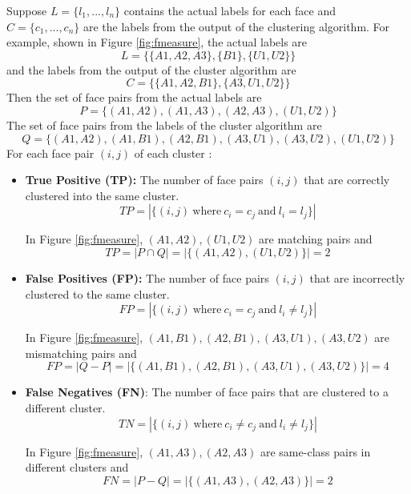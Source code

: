 \documentclass[12pt,english]{article}
\begin{document}
Suppose $L = \{l_{1},...,l_{n}\}$ contains the actual labels for each face and $C = \{c_{1},...,c_{n}\}$ are the labels from the output of the clustering algorithm. For example, shown in Figure \ref{fig:fmeasure}, the actual labels are $$L = \{\{A1, A2, A3\}, \{B1\}, \{U1, U2\}\}$$ and the labels from the output of the cluster algorithm are $$C = \{\{A1, A2, B1\}, \{A3, U1, U2 \}\}$$
Then the set of face pairs from the actual labels are $$P = \{(A1, A2), (A1, A3), (A2, A3), (U1, U2)\}$$ 
The set of face pairs from the labels of the cluster algorithm are $$Q = \{(A1, A2), (A1, B1), (A2, B1), (A3, U1), (A3, U2), (U1, U2)\}$$
For each face pair $(i, j)$ of each cluster \cite{thesis}: \\
\begin{itemize}
\item \textbf{True Positive (TP):} The number of face pairs $(i, j)$ that are correctly clustered into the same cluster.
$$TP = | \{(i, j) \ \textrm{where} \ c_{i} = c_{j} \ \textrm{and} \ l_{i} = l_{j}\}|$$

In Figure \ref{fig:fmeasure}, $(A1, A2), (U1, U2)$ are matching pairs and
$$TP = | P \cap Q | = |\{(A1, A2), (U1, U2)\}| = 2$$

\item \textbf{False Positives (FP):} The number of face pairs $(i, j)$ that are incorrectly clustered to the same cluster. $$FP = | \{(i, j) \ \textrm{where} \ c_{i} = c_{j} \ \textrm{and} \ l_{i} \neq l_{j}\}|$$

In Figure \ref{fig:fmeasure}, $(A1, B1), (A2, B1), (A3, U1), (A3, U2)$ are mismatching pairs and $$FP = |Q - P| = |\{(A1, B1), (A2, B1), (A3, U1), (A3, U2)\}| = 4$$ 

\item \textbf{False Negatives (FN)}: The number of face pairs that are clustered to a different cluster. $$TN = | \{(i, j) \ \textrm{where} \ c_{i} \neq c_{j} \ \textrm{and} \ l_{i} \neq l_{j}\}|$$

In Figure \ref{fig:fmeasure}, $(A1, A3), (A2, A3)$ are same-class pairs in different clusters and $$FN = |P - Q| = |\{(A1, A3), (A2, A3)\}| = 2$$
\end{itemize}
\end{document}
